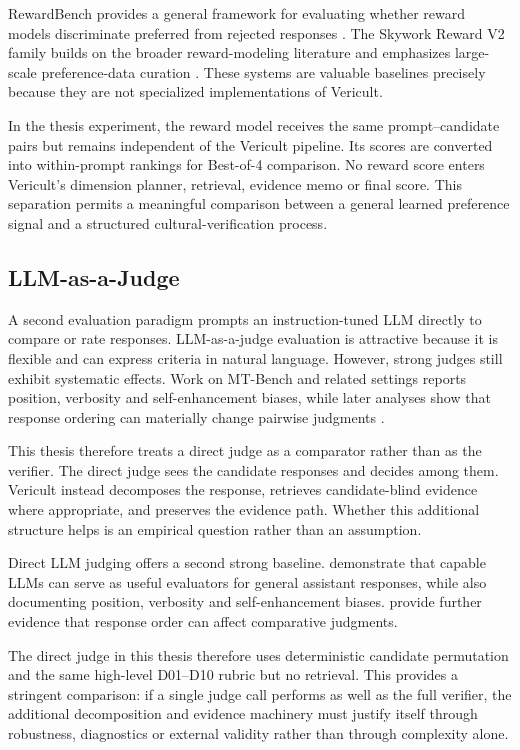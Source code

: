 RewardBench provides a general framework for evaluating whether reward models discriminate preferred from rejected responses \parencite{lambert2025rewardbench}. The Skywork Reward V2 family builds on the broader reward-modeling literature and emphasizes large-scale preference-data curation \parencite{liu2026skyworkrewardv2}. These systems are valuable baselines precisely because they are not specialized implementations of Vericult.

In the thesis experiment, the reward model receives the same prompt--candidate pairs but remains independent of the Vericult pipeline. Its scores are converted into within-prompt rankings for Best-of-4 comparison. No reward score enters Vericult's dimension planner, retrieval, evidence memo or final score. This separation permits a meaningful comparison between a general learned preference signal and a structured cultural-verification process.

\subsection{LLM-as-a-Judge}
A second evaluation paradigm prompts an instruction-tuned LLM directly to compare or rate responses. LLM-as-a-judge evaluation is attractive because it is flexible and can express criteria in natural language. However, strong judges still exhibit systematic effects. Work on MT-Bench and related settings reports position, verbosity and self-enhancement biases, while later analyses show that response ordering can materially change pairwise judgments \parencite{zheng2023llmjudge,wang2024notfairevaluators}.

This thesis therefore treats a direct judge as a comparator rather than as the verifier. The direct judge sees the candidate responses and decides among them. Vericult instead decomposes the response, retrieves candidate-blind evidence where appropriate, and preserves the evidence path. Whether this additional structure helps is an empirical question rather than an assumption.

Direct LLM judging offers a second strong baseline. \textcite{zheng2023llmjudge} demonstrate that capable LLMs can serve as useful evaluators for general assistant responses, while also documenting position, verbosity and self-enhancement biases. \textcite{wang2024notfairevaluators} provide further evidence that response order can affect comparative judgments.

The direct judge in this thesis therefore uses deterministic candidate permutation and the same high-level D01--D10 rubric but no retrieval. This provides a stringent comparison: if a single judge call performs as well as the full verifier, the additional decomposition and evidence machinery must justify itself through robustness, diagnostics or external validity rather than through complexity alone.

